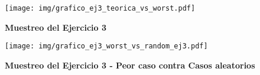 \documentclass[11pt, a4paper, twoside]{article}
\begin{document}


\begin{figure}[H]
   \begin{center}
   \texttt{[image: img/grafico\_ej3\_teorica\_vs\_worst.pdf]}
   \caption{\textbf{Muestreo del Ejercicio 3}}
   \label{fig:ej3_test_teo}
   \end{center}
\end{figure}


\begin{figure}[H]
   \begin{center}
   \texttt{[image: img/grafico\_ej3\_worst\_vs\_random\_ej3.pdf]}
   \caption{\textbf{Muestreo del Ejercicio 3 - Peor caso contra Casos aleatorios}}
   \label{fig:ej3_test_random}
   \end{center}
\end{figure}


\end{document}

